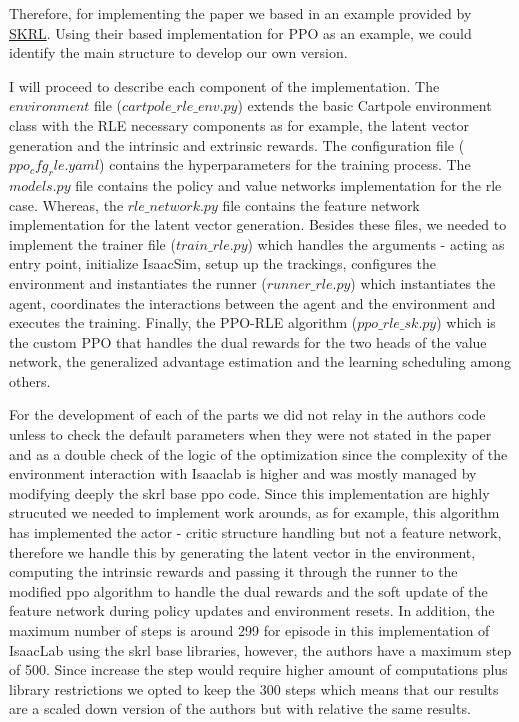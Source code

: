 \documentclass[10pt]{article} %
\begin{document}
Therefore, for implementing the paper we based in an example provided by \href{https://skrl.readthedocs.io/en/latest/#}{SKRL}.
Using their based implementation for PPO as an example, we could identify the main structure to develop our own version. 

I will proceed to describe each component of the implementation. The $environment$ file ($cartpole\_rle\_env.py$) extends the basic Cartpole environment class with the RLE necessary components as for example, 
the latent vector generation and the intrinsic and extrinsic rewards. The configuration file ($ppo_cfg_rle.yaml$) contains the hyperparameters for the training process. The $models.py$ file contains the policy and value networks
implementation for the rle case. Whereas, the $rle\_network.py$ file contains the feature network implementation for the latent vector generation. 
Besides these files, we needed to implement the trainer file ($train\_rle.py$) which handles the arguments - acting as entry point, initialize IsaacSim, setup up the trackings, configures the environment and 
instantiates the runner ($runner\_rle.py$) which instantiates the agent, coordinates the interactions between the agent and the environment and executes the training. Finally, the PPO-RLE algorithm ($ppo\_rle\_sk.py$)
which is the custom PPO that handles the dual rewards for the two heads of the value network, the generalized advantage estimation and the learning scheduling among others. 

For the development of each of the parts we did not relay in the authors code unless to check the default parameters when they were not stated in the paper and as a double check of the logic of the optimization since the 
complexity of the environment interaction with Isaaclab is higher and was mostly managed by modifying deeply the skrl base ppo code. Since this implementation are highly strucuted we needed to implement work arounds, as for example,
this algorithm has implemented the actor - critic structure handling but not a feature network, therefore we handle this by generating the latent vector in the environment, computing the intrinsic rewards and passing it through the runner 
to the modified ppo algorithm to handle the dual rewards and the soft update of the feature network during policy updates and environment resets. In addition, the maximum number of steps is around 299 for episode in this implementation of
IsaacLab using the skrl base libraries, however, the authors have a maximum step of 500. Since increase the step would require higher amount of computations plus library restrictions we opted to keep the 300 steps which means that our results are
a scaled down version of the authors but with relative the same results. 
\end{document}
